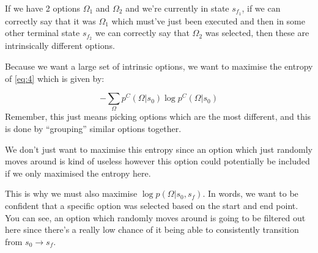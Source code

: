 \documentclass{article}
\begin{document}
  If we have 2 options \(\Omega_{1}\) and \(\Omega_{2}\) and we're currently in state \(s_{f_{1}}\), if we can correctly say that it was \(\Omega_{1}\) which must've just been executed and then in some other terminal state \(s_{f_{2}}\) we can correctly say that \(\Omega_{2}\) was selected, then these are intrinsically different options.



  Because we want a large set of intrinsic options, we want to maximise the entropy of \eqref{eq:4} which is given by:

\begin{equation}
  \label{eq:6}
-\sum_{\Omega} p^{C}(\Omega|s_{0}) \log p^{C}(\Omega | s_{0})
\end{equation}
Remember, this just means picking options which are the most different, and this is done by ``grouping'' similar options together.

We don't just want to maximise this entropy since an option which just randomly moves around is kind of useless however this option could potentially be included if we only maximised the entropy here.


This is why we must also maximise \(\log p(\Omega | s_{0}, s_{f})\). In words, we want to be confident that a specific option was selected based on the start and end point. You can see, an option which randomly moves around is going to be filtered out here since there's a really low chance of it being able to consistently transition from \(s_{0} \to s_{f}\).
\end{document}
